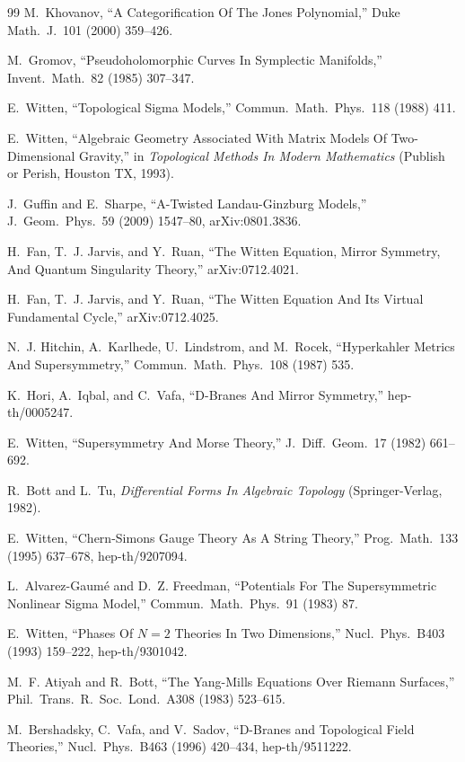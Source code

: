 \documentclass[11pt,a4paper,UTF8]{ctexart}
\theoremstyle{plain}
\theoremstyle{definition}
\begin{document}
\begin{thebibliography}{99}
 M.~Khovanov, ``A Categorification Of The Jones Polynomial,''
  Duke Math.\ J.\ 101 (2000) 359--426.

 M.~Gromov, ``Pseudoholomorphic Curves In Symplectic Manifolds,''
  Invent.\ Math.\ 82 (1985) 307--347.

 E.~Witten, ``Topological Sigma Models,''
  Commun.\ Math.\ Phys.\ 118 (1988) 411.

 E.~Witten, ``Algebraic Geometry Associated With Matrix Models Of
  Two-Dimensional Gravity,'' in \emph{Topological Methods In Modern
  Mathematics} (Publish or Perish, Houston TX, 1993).

 J.~Guffin and E.~Sharpe, ``A-Twisted Landau-Ginzburg Models,''
  J.\ Geom.\ Phys.\ 59 (2009) 1547--80, arXiv:0801.3836.

 H.~Fan, T.~J. Jarvis, and Y.~Ruan, ``The Witten Equation, Mirror
  Symmetry, And Quantum Singularity Theory,'' arXiv:0712.4021.

 H.~Fan, T.~J. Jarvis, and Y.~Ruan, ``The Witten Equation And Its
  Virtual Fundamental Cycle,'' arXiv:0712.4025.

 N.~J. Hitchin, A.~Karlhede, U.~Lindstrom, and M.~Rocek,
  ``Hyperkahler Metrics And Supersymmetry,'' Commun.\ Math.\ Phys.\ 108
  (1987) 535.

 K.~Hori, A.~Iqbal, and C.~Vafa, ``D-Branes And Mirror
  Symmetry,'' hep-th/0005247.

 E.~Witten, ``Supersymmetry And Morse Theory,''
  J.\ Diff.\ Geom.\ 17 (1982) 661--692.

 R.~Bott and L.~Tu, \emph{Differential Forms In Algebraic
  Topology} (Springer-Verlag, 1982).

 E.~Witten, ``Chern-Simons Gauge Theory As A String Theory,''
  Prog.\ Math.\ 133 (1995) 637--678, hep-th/9207094.

 L.~Alvarez-Gaum\'e and D.~Z. Freedman, ``Potentials For The
  Supersymmetric Nonlinear Sigma Model,'' Commun.\ Math.\ Phys.\ 91 (1983) 87.

 E.~Witten, ``Phases Of $N=2$ Theories In Two Dimensions,''
  Nucl.\ Phys.\ B403 (1993) 159--222, hep-th/9301042.

 M.~F. Atiyah and R.~Bott, ``The Yang-Mills Equations Over
  Riemann Surfaces,'' Phil.\ Trans.\ R.\ Soc.\ Lond.\ A308 (1983) 523--615.

 M.~Bershadsky, C.~Vafa, and V.~Sadov, ``D-Branes and Topological
  Field Theories,'' Nucl.\ Phys.\ B463 (1996) 420--434, hep-th/9511222.


\end{thebibliography}
\end{document}
